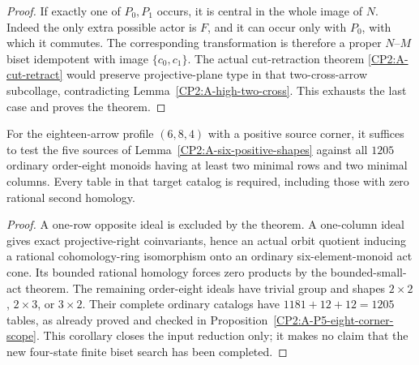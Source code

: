 \begin{proof}
If exactly one of $P_0,P_1$ occurs, it is central in the
whole image of $N$. Indeed the only extra possible actor
is $F$, and it can occur only with $P_0$, with which it
commutes. The corresponding transformation is therefore
a proper $N$--$M$ biset idempotent with image
$\{c_0,c_1\}$. The actual cut-retraction theorem
\ref{CP2:A-cut-retract} would preserve projective-plane
type in that two-cross-arrow subcollage, contradicting
Lemma~\ref{CP2:A-high-two-cross}.
This exhausts the last case and proves the theorem.
\end{proof}

\begin{corollary}
\label{CP2:A-six-eight-four-target-scope}
For the eighteen-arrow profile $(6,8,4)$ with a positive
source corner, it suffices to test the five sources of
Lemma~\ref{CP2:A-six-positive-shapes} against all $1205$
ordinary order-eight monoids having at least two minimal
rows and two minimal columns. Every table in that target
catalog is required, including those with zero rational
second homology.
\end{corollary}
\begin{proof}
A one-row opposite ideal is excluded by the theorem.
A one-column ideal gives exact projective-right
coinvariants, hence an actual orbit quotient inducing a
rational cohomology-ring isomorphism onto an ordinary
six-element-monoid act cone. Its bounded rational homology
forces zero products by the bounded-small-act theorem.
The remaining order-eight ideals have trivial group and
shapes $2\times2$, $2\times3$, or $3\times2$.
Their complete ordinary catalogs have
$1181+12+12=1205$ tables, as already proved and checked in
Proposition~\ref{CP2:A-P5-eight-corner-scope}.
This corollary closes the input reduction only; it makes
no claim that the new four-state finite biset search has
been completed.
\end{proof}
